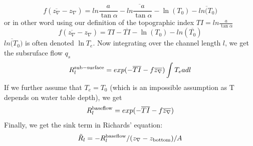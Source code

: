 \documentclass[twoside,10pt]{report}
\begin{document}
\begin{equation}
    f(\overline{z_{\nabla}}-z_{\nabla}) = ln \frac{a}{\tan \alpha} - \overline{ln \frac{a}{\tan \alpha}} - \ln(T_0)-\overline{ln(T_0})
\end{equation}
or in other word using our definition of the topographic index $TI = ln \frac{a}{\tan \alpha}$
\begin{equation}
    f(\overline{z_{\nabla}}-z_{\nabla}) = TI - \overline{TI} - \ln(T_0)-ln(\overline{T_0})
\end{equation}
$\overline{ln(T_0})$ is often denoted $\ln T_e$.
Now integrating over the channel length $l$, we get the subsruface flow $q_s$
\begin{equation}
    R_l^{\rm sub-surface} = exp(-\overline{TI} - f \overline{z_{\nabla}}) \int T_e a dl
    \label{subsurface_flow}
\end{equation}
If we further assume that $T_e=T_0$ (which is an impossible assumption as T depends on water table depth), we get 
\begin{equation}
    R_l^{\rm baseflow} = exp(-\overline{TI} - f \overline{z_{\nabla}}) 
    \label{subsurface_flow}
\end{equation}
Finally, we get the sink term in Richards' equation:
\begin{equation}
    \tilde R_l = -R_l^{\rm baseflow}/(z_{\nabla} - z_{\rm bottom})/A
    \label{subsurface_flow_Richards}
\end{equation}





















\end{document}
